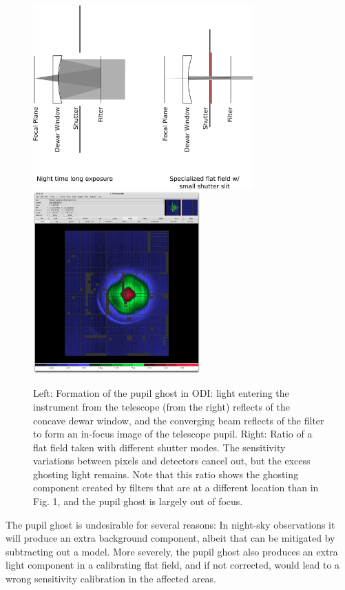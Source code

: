\documentclass[]{spieman}
\begin{document}
\begin{figure}
\centering
\includegraphics[height=7cm]{images/odishutterpupilghostsupression.png}
\hspace{0.75cm} \includegraphics[height=7cm]{images/odi_layeronepg.png}
	
\caption{ \label{fig_pupilghost}Left: Formation of the pupil ghost in ODI: 
    light entering the instrument from the telescope (from the right) reflects of
    the concave dewar window, and the converging beam reflects of the filter to form
    an in-focus image of the telescope pupil. Right: Ratio of a flat field taken
    with different shutter modes. The sensitivity variations between pixels and
    detectors cancel out, but the excess ghosting light remains. Note that this
    ratio shows the ghosting component created by filters that are at a different
    location than in Fig. 1, and the pupil ghost is largely out of focus.}
\end{figure}

The pupil ghost is undesirable for several reasons: In night-sky observations it
will produce an extra background component, albeit that can be mitigated by
subtracting out a model. More severely, the pupil ghost also produces an extra
light component in a calibrating flat field, and if not corrected, would lead to
a wrong sensitivity calibration in the affected areas.
\end{document}
